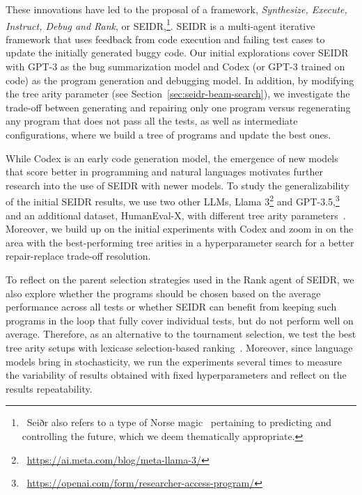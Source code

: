 These innovations have led to the proposal of a framework, \emph{Synthesize, Execute, Instruct, Debug and Rank}, or SEIDR,\footnote{~Seiðr also refers to a type of Norse magic~\cite{blain2002:nine} pertaining to predicting and controlling the future, which we deem thematically appropriate.}. 
SEIDR is a multi-agent iterative framework that uses feedback from code execution and failing test cases to update the initially generated buggy code. 
Our initial explorations cover SEIDR with GPT-3 as the bug summarization model and Codex (or GPT-3 trained on code) as the program generation and debugging model.  
In addition, by modifying the tree arity parameter (see Section~\ref{sec:seidr-beam-search}), we investigate the trade-off between generating and repairing only one program versus regenerating any program that does not pass all the tests, as well as intermediate configurations, where we build a tree of programs and update the best ones.

While Codex is an early code generation model, the emergence of new models that score better in programming and natural languages motivates further research into the use of SEIDR with newer models. 
To study the generalizability of the initial SEIDR results, we use two other LLMs, Llama 3\footnote{~\url{https://ai.meta.com/blog/meta-llama-3/}} and GPT-3.5,\footnote{~\url{https://openai.com/form/researcher-access-program/}} and an additional dataset, HumanEval-X, with different tree arity parameters~\cite{brown2020:language,chenEvaluatingLargeLanguage2021,zheng2023:codegeex}. 
Moreover, we build up on the initial experiments with Codex and zoom in on the area with the best-performing tree arities in a hyperparameter search for a better repair-replace trade-off resolution. 

To reflect on the parent selection strategies used in the Rank agent of SEIDR, we also explore whether the programs should be chosen based on the average performance across all tests or whether SEIDR can benefit from keeping such programs in the loop that fully cover individual tests, but do not perform well on average.
Therefore, as an alternative to the tournament selection, we test the best tree arity setups with lexicase selection-based ranking~\cite{helmuth2015:solving}.
Moreover, since language models bring in stochasticity, we run the experiments several times to measure the variability of results obtained with fixed hyperparameters and reflect on the results repeatability.


